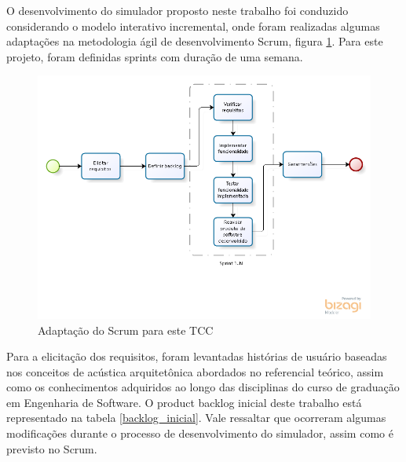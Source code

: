 O desenvolvimento do simulador proposto neste trabalho foi conduzido considerando o modelo interativo incremental, onde foram realizadas algumas adaptações na metodologia ágil de desenvolvimento Scrum, figura \ref{scrum_adaptado}. Para este projeto, foram definidas sprints com duração de uma semana.

\FloatBarrier 
\begin{figure}[!htb]
\centering
\includegraphics[scale=0.7]{figuras/scrum_adaptado}
\caption{Adaptação do Scrum para este TCC}
\label{scrum_adaptado}
\end{figure}

Para a elicitação dos requisitos, foram levantadas histórias de usuário baseadas nos conceitos de acústica arquitetônica abordados no referencial teórico, assim como os conhecimentos adquiridos ao longo das disciplinas do curso de graduação em Engenharia de Software. O product backlog inicial deste trabalho está representado na tabela \ref{backlog_inicial}. Vale ressaltar que ocorreram algumas modificações durante o processo de desenvolvimento do simulador, assim como é previsto no Scrum.

